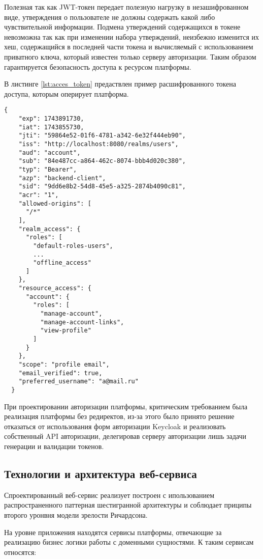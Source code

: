 Полезная так как JWT-токен передает полезную нагрузку в незашифрованном виде, утверждения о пользователе не должны содержать какой либо чувствительной информации.
Подмена утверждений содержащихся в токене невозможна так как при изменении набора утверждений, неизбежно изменится их хеш, содержащийся в последней части токена и вычисляемый с использованием приватного ключа, который известен только серверу авторизации. Таким образом гарантируется безопасность доступа к ресурсом платформы.

В листинге \ref{lst:acces_token} предаствлен пример расшифрованного токена доступа, которым оперирует платформа.

\begin{lstlisting}[caption={Токен доступа}, label=lst:acces_token]
  {
    "exp": 1743891730,
    "iat": 1743855730,
    "jti": "59864e52-01f6-4781-a342-6e32f444eb90",
    "iss": "http://localhost:8080/realms/users",
    "aud": "account",
    "sub": "84e487cc-a864-462c-8074-bbb4d020c380",
    "typ": "Bearer",
    "azp": "backend-client",
    "sid": "9dd6e8b2-54d8-45e5-a325-2874b4090c81",
    "acr": "1",
    "allowed-origins": [
      "/*"
    ],
    "realm_access": {
      "roles": [
        "default-roles-users",
        ...
        "offline_access"
      ]
    },
    "resource_access": {
      "account": {
        "roles": [
          "manage-account",
          "manage-account-links",
          "view-profile"
        ]
      }
    },
    "scope": "profile email",
    "email_verified": true,
    "preferred_username": "a@mail.ru"
  }
\end{lstlisting}

При проектировании авторизации платформы, критическим требованием была реализация платформы без редиректов, из-за этого было принято решение отказаться от использования форм авторизации Keycloak и реализовать собственный API авторизации, делегировав серверу авторизации лишь задачи генерации и валидации токенов.

\subsection{Технологии и архитектура веб-сервиса}

Спроектированный веб-сервис реализует построен с ипользованием распространенного паттерная шестигранной архитектуры\cite{richardson2023microservices} и соблюдает приципы второго уронвня модели зрелости Ричардсона\cite{salvadori2015maturity}. 

На уровне приложения находятся сервисы платформы, отвечающие за реализацию бизнес логики работы с доменными сущностями. К таким сервисам относятся:

